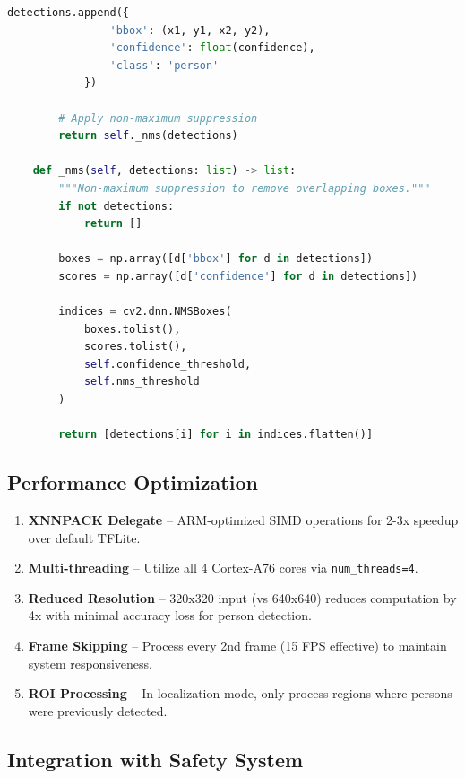 \documentclass[11pt,letterpaper]{article}
\begin{document}
\begin{lstlisting}[language=Python, caption=person\_detector.py]
            detections.append({
                'bbox': (x1, y1, x2, y2),
                'confidence': float(confidence),
                'class': 'person'
            })

        # Apply non-maximum suppression
        return self._nms(detections)

    def _nms(self, detections: list) -> list:
        """Non-maximum suppression to remove overlapping boxes."""
        if not detections:
            return []

        boxes = np.array([d['bbox'] for d in detections])
        scores = np.array([d['confidence'] for d in detections])

        indices = cv2.dnn.NMSBoxes(
            boxes.tolist(),
            scores.tolist(),
            self.confidence_threshold,
            self.nms_threshold
        )

        return [detections[i] for i in indices.flatten()]
\end{lstlisting}

\subsection{Performance Optimization}

\begin{enumerate}
    \item \textbf{XNNPACK Delegate} -- ARM-optimized SIMD operations for 2-3x speedup over default TFLite.

    \item \textbf{Multi-threading} -- Utilize all 4 Cortex-A76 cores via \texttt{num\_threads=4}.

    \item \textbf{Reduced Resolution} -- 320x320 input (vs 640x640) reduces computation by 4x with minimal accuracy loss for person detection.

    \item \textbf{Frame Skipping} -- Process every 2nd frame (15 FPS effective) to maintain system responsiveness.

    \item \textbf{ROI Processing} -- In localization mode, only process regions where persons were previously detected.
\end{enumerate}

\subsection{Integration with Safety System}
\end{document}
